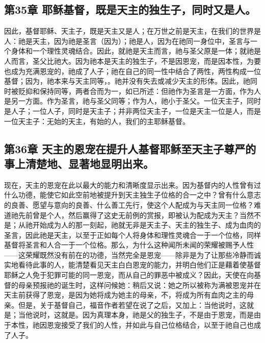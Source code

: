 
\subsection{第35章 耶稣基督，既是天主的独生子，同时又是人。}

因此，基督耶稣、天主子，既是天主又是人；在万世之前是天主，在我们的世界是人：祂是天主，因为祂是圣言（因为）；祂是人，因为在祂同一身位中，圣言与一个身体和一个理性灵魂结合。因此，就祂是天主而言，祂与圣父原是一体；就祂是人而言，圣父比祂大。因为祂本是天主的独生子，不是因恩宠，而是因本性，为要也成为充满恩宠的，祂成了人子；祂在自己的同一性中结合了两性，两性构成一位基督；因为，祂本来与天主同等，。祂并没有失去或减少天主的形体。因此，祂同时被贬抑和保持同等，两者合而为一，如已所述：但祂作为圣言是一方面，作为人是另一方面。作为圣言，祂与圣父同等；作为人，祂小于圣父。一位天主子，同时是人子；一位人子，同时是天主子；并非两位天主子，一位是天主一位是人，而是一位天主子：无始的天主，有始的人，我们的主耶稣基督。\par


\subsection{第36章 天主的恩宠在提升人基督耶稣至天主子尊严的事上清楚地、显著地显明出来。}

现在，天主的恩宠在此以最大的能力和清晰度显示出来。因为基督内的人性曾有过什么功德，能使它如此空前地被提升到天主独生子位格的合一之中？曾有什么意志的良善、愿望与意向的良善、什么善工先行，使这个人配成为与天主同一位格？难道祂先前曾是个人，然后赢得了这史无前例的赏报，即被认为配成为天主？当然不是；从祂开始成为人的那一刻起，祂就无非是天主子、天主的独生子、成为血肉的圣言，因此祂是天主，以至于正如每个人将身体和理性灵魂合一于一个位格，同样基督将圣言和人合一于一个位格。那么，为什么这种闻所未闻的荣耀被赐予人性——这荣耀既然没有前在的功德，当然完全是恩宠——除非是为了让那些冷静而诚实地看待此事的人，能清楚看见天主白白恩宠的能力，并明白他们正是藉着使基督耶稣之人免于犯罪可能的同一恩宠，而从自己的罪恶中被成义？因此，天使在向基督的母亲预报祂的诞生时，这样问候她：稍后又说：她之所以被称为满被恩宠并在天主前获得了恩宠，是因为她将成为她主的母亲，不，将成为所有血肉之主的母亲。但是，关于基督自己，福音作者若望在说了之后，又加上：当他说时，这就是；当他说时，这就是。因为真理本身，祂是父的独生子，不是由于恩宠，而是由于本性，祂因恩宠接受了我们的人性，并如此与自己位格结合，以至于祂自己也成了人子。\par

